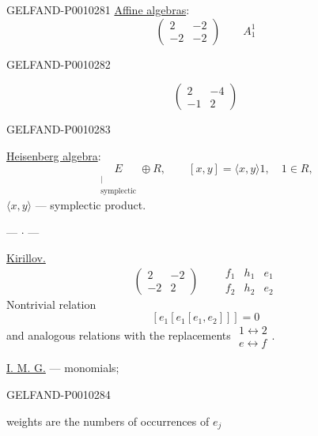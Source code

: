 \begin{GelfandAdjacentEvidence}{GELFAND-P001028}{1}
\underline{Affine algebras}:
\[
\begin{pmatrix}2&-2\\-2&-2\end{pmatrix}\qquad A_1^1
\]
\end{GelfandAdjacentEvidence}
\begin{GelfandAdjacentEvidence}{GELFAND-P001028}{2}

\[
\begin{pmatrix}2&-4\\-1&2\end{pmatrix}
\]
\end{GelfandAdjacentEvidence}
\begin{GelfandAdjacentEvidence}{GELFAND-P001028}{3}


\underline{Heisenberg algebra}:
\[
\underset{\substack{\vert\\\text{symplectic}}}{E}\oplus R,\qquad
[x,y]=\langle x,y\rangle 1,\quad 1\in R,
\]
$\langle x,y\rangle$ --- symplectic product.

\begin{center}--- $\cdot$ ---\end{center}

\underline{Kirillov.}
\[
\begin{pmatrix}2&-2\\-2&2\end{pmatrix}\qquad
\begin{array}{ccc}f_1&h_1&e_1\\f_2&h_2&e_2\end{array}
\]
Nontrivial relation
\[
[e_1[e_1[e_1,e_2]]]=0
\]
and analogous relations with the replacements \(\begin{array}{c}1\leftrightarrow2\\e\leftrightarrow f\end{array}\).

\underline{I. M. G.}  --- monomials;
\end{GelfandAdjacentEvidence}
\begin{GelfandAdjacentEvidence}{GELFAND-P001028}{4}


weights are the numbers of occurrences of $e_j$
\end{GelfandAdjacentEvidence}
